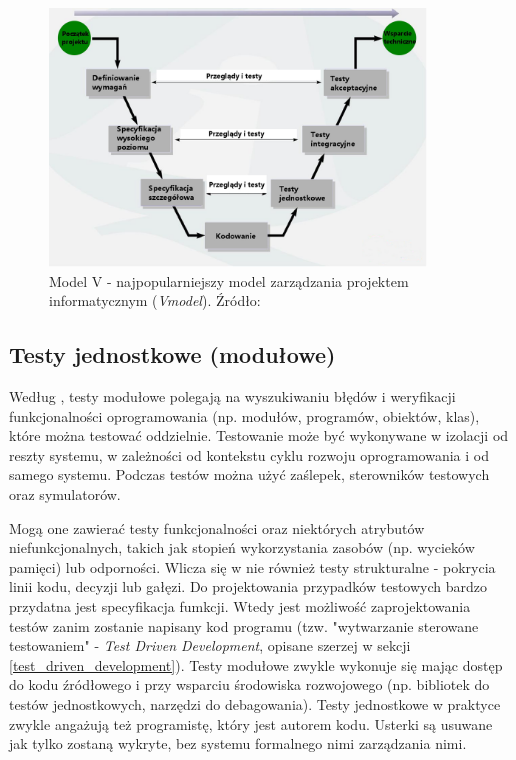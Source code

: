 \begin{figure}[!htb]
    \centering
    \includegraphics[width=10cm]{imgs/ch2_model_v.jpg}
    \caption{Model V - najpopularniejszy model zarządzania projektem informatycznym (\textit{V\-model}). Źródło: \cite{website:android:modelv}}
    \label{fig:model_v}
\end{figure} 

\subsection{Testy jednostkowe (modułowe)}

Według \cite{bib:sylabus:foundation}, testy modułowe polegają na wyszukiwaniu błędów i weryfikacji funkcjonalności oprogramowania (np. modułów, programów, obiektów, klas), które można testować oddzielnie. Testowanie może być wykonywane w izolacji od reszty systemu, w zależności od kontekstu cyklu rozwoju oprogramowania i od samego systemu. Podczas testów można użyć zaślepek, sterowników testowych oraz symulatorów. 

Mogą one zawierać testy funkcjonalności oraz niektórych atrybutów niefunkcjonalnych, takich jak stopień wykorzystania zasobów (np. wycieków pamięci) lub odporności. Wlicza się w nie również testy strukturalne - pokrycia linii kodu, decyzji lub gałęzi. Do projektowania przypadków testowych bardzo przydatna jest specyfikacja fumkcji. Wtedy jest możliwość zaprojektowania testów zanim zostanie napisany kod programu (tzw. "wytwarzanie sterowane testowaniem" - \textit{Test Driven Development}, opisane szerzej w sekcji \ref{test_driven_development}). Testy modułowe zwykle wykonuje się mając dostęp do kodu źródłowego i przy wsparciu środowiska rozwojowego (np. bibliotek do testów jednostkowych, narzędzi do debagowania). Testy jednostkowe w praktyce zwykle angażują też programistę, który jest autorem kodu. Usterki są usuwane jak tylko zostaną wykryte, bez systemu formalnego nimi zarządzania nimi.

